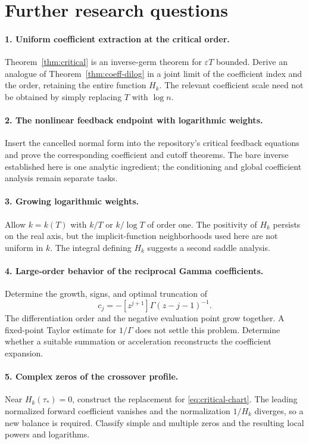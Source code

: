 \documentclass[11pt,a4paper]{article}
\numberwithin{equation}{section}
\theoremstyle{definition}
\theoremstyle{remark}
\newcommand{\eps}{\varepsilon}
\begin{document}
\section{Further research questions}
\label{sec:questions}

\paragraph{1. Uniform coefficient extraction at the critical order.}
Theorem~\ref{thm:critical} is an inverse-germ theorem for
\(\eps T\) bounded.  Derive an analogue of
Theorem~\ref{thm:coeff-dilog} in a joint limit of the coefficient
index and the order, retaining the entire function \(H_k\).
The relevant coefficient scale need not be obtained by simply
replacing \(T\) with \(\log n\).

\paragraph{2. The nonlinear feedback endpoint with logarithmic weights.}
Insert the cancelled normal form into the repository's critical
feedback equations and prove the corresponding coefficient and
cutoff theorems.  The bare inverse established here is one analytic
ingredient; the conditioning and global coefficient analysis remain
separate tasks.

\paragraph{3. Growing logarithmic weights.}
Allow \(k=k(T)\) with \(k/T\) or \(k/\log T\) of order one.
The positivity of \(H_k\) persists on the real axis, but the
implicit-function neighborhoods used here are not uniform in \(k\).
The integral defining \(H_k\) suggests a second saddle analysis.

\paragraph{4. Large-order behavior of the reciprocal Gamma coefficients.}
Determine the growth, signs, and optimal truncation of
\[
 c_j=-[z^{j+1}]\Gamma(z-j-1)^{-1}.
\]
The differentiation order and the negative evaluation point grow
together.  A fixed-point Taylor estimate for \(1/\Gamma\) does not
settle this problem.  Determine whether a suitable summation or
acceleration reconstructs the coefficient expansion.

\paragraph{5. Complex zeros of the crossover profile.}
Near \(H_k(\tau_*)=0\), construct the replacement for
\eqref{eq:critical-chart}.  The leading normalized forward coefficient
vanishes and the normalization \(1/H_k\) diverges, so a new balance is
required.  Classify simple and multiple zeros and
the resulting local powers and logarithms.
\end{document}
